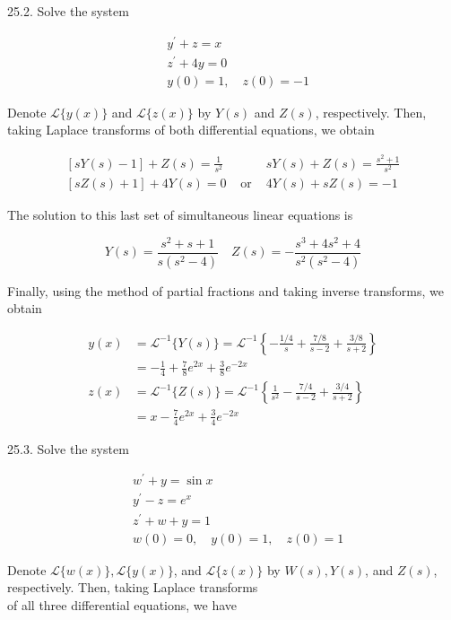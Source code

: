 \documentclass[10pt]{article}
\begin{document}
25.2. Solve the system

$$
\begin{aligned}
& y^{\prime}+z=x \\
& z^{\prime}+4 y=0 \\
& y(0)=1, \quad z(0)=-1
\end{aligned}
$$

Denote $\mathscr{L}\{y(x)\}$ and $\mathscr{L}\{z(x)\}$ by $Y(s)$ and $Z(s)$, respectively. Then, taking Laplace transforms of both differential equations, we obtain

$$
\begin{array}{lll}
{[s Y(s)-1]+Z(s)=\frac{1}{s^{2}}} & & s Y(s)+Z(s)=\frac{s^{2}+1}{s^{2}} \\
{[s Z(s)+1]+4 Y(s)=0} & \text { or } & 4 Y(s)+s Z(s)=-1
\end{array}
$$

The solution to this last set of simultaneous linear equations is

$$
Y(s)=\frac{s^{2}+s+1}{s\left(s^{2}-4\right)} \quad Z(s)=-\frac{s^{3}+4 s^{2}+4}{s^{2}\left(s^{2}-4\right)}
$$

Finally, using the method of partial fractions and taking inverse transforms, we obtain

$$
\begin{aligned}
y(x) & =\mathscr{L}^{-1}\{Y(s)\}=\mathscr{L}^{-1}\left\{-\frac{1 / 4}{s}+\frac{7 / 8}{s-2}+\frac{3 / 8}{s+2}\right\} \\
& =-\frac{1}{4}+\frac{7}{8} e^{2 x}+\frac{3}{8} e^{-2 x} \\
z(x) & =\mathscr{L}^{-1}\{Z(s)\}=\mathscr{L}^{-1}\left\{\frac{1}{s^{2}}-\frac{7 / 4}{s-2}+\frac{3 / 4}{s+2}\right\} \\
& =x-\frac{7}{4} e^{2 x}+\frac{3}{4} e^{-2 x}
\end{aligned}
$$

25.3. Solve the system

$$
\begin{aligned}
& w^{\prime}+y=\sin x \\
& y^{\prime}-z=e^{x} \\
& z^{\prime}+w+y=1 \\
& w(0)=0, \quad y(0)=1, \quad z(0)=1
\end{aligned}
$$

Denote $\mathscr{L}\{w(x)\}, \mathscr{L}\{y(x)\}$, and $\mathscr{L}\{z(x)\}$ by $W(s), Y(s)$, and $Z(s)$, respectively. Then, taking Laplace transforms\\
of all three differential equations, we have
\end{document}
